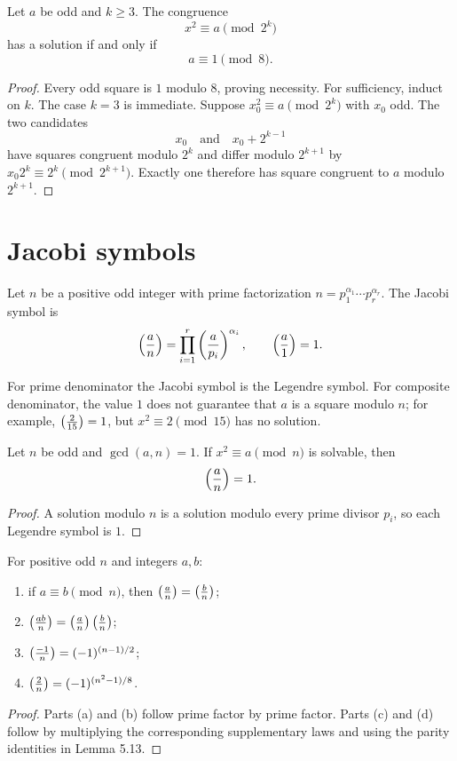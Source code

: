\begin{thm}
Let $a$ be odd and $k\ge3$.  The congruence
\[
 x^2\equiv a\pmod{2^k}
\]
has a solution if and only if
\[
 a\equiv1\pmod8.
\]
\end{thm}
\begin{proof}
Every odd square is $1$ modulo $8$, proving necessity.  For sufficiency, induct on $k$.  The case $k=3$ is immediate.  Suppose $x_0^2\equiv a\pmod{2^k}$ with $x_0$ odd.  The two candidates
\[
 x_0\quad\text{and}\quad x_0+2^{k-1}
\]
have squares congruent modulo $2^k$ and differ modulo $2^{k+1}$ by
$x_0 2^k\equiv2^k\pmod{2^{k+1}}$.  Exactly one therefore has square congruent to $a$ modulo $2^{k+1}$.
\end{proof}

\section{Jacobi symbols}

\begin{de}
Let $n$ be a positive odd integer with prime factorization
$n=p_1^{\alpha_1}\cdots p_r^{\alpha_r}$.  The Jacobi symbol is
\[
 \left(\frac{a}{n}\right)=\prod_{i=1}^r\left(\frac{a}{p_i}\right)^{\alpha_i},
 \qquad
 \left(\frac{a}{1}\right)=1.
\]
\end{de}
\begin{remark}
For prime denominator the Jacobi symbol is the Legendre symbol.  For composite denominator, the value $1$ does not guarantee that $a$ is a square modulo $n$; for example, $\left(\frac{2}{15}\right)=1$, but $x^2\equiv2\pmod{15}$ has no solution.
\end{remark}

\begin{thm}
Let $n$ be odd and $\gcd(a,n)=1$.  If $x^2\equiv a\pmod n$ is solvable, then
\[
 \left(\frac{a}{n}\right)=1.
\]
\end{thm}
\begin{proof}
A solution modulo $n$ is a solution modulo every prime divisor $p_i$, so each Legendre symbol is $1$.
\end{proof}

\begin{thm}
For positive odd $n$ and integers $a,b$:
\begin{enumerate}[label=(\alph*)]
\item if $a\equiv b\pmod n$, then $\left(\frac{a}{n}\right)=\left(\frac{b}{n}\right)$;
\item $\left(\frac{ab}{n}\right)=\left(\frac{a}{n}\right)\left(\frac{b}{n}\right)$;
\item $\left(\frac{-1}{n}\right)=(-1)^{(n-1)/2}$;
\item $\left(\frac{2}{n}\right)=(-1)^{(n^2-1)/8}$.
\end{enumerate}
\end{thm}
\begin{proof}
Parts (a) and (b) follow prime factor by prime factor.  Parts (c) and (d) follow by multiplying the corresponding supplementary laws and using the parity identities in Lemma 5.13.
\end{proof}

